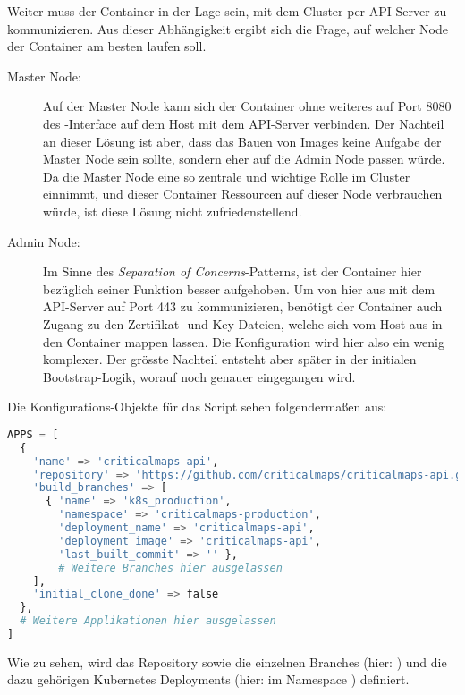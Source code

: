 Weiter muss der Container in der Lage sein, mit dem Cluster per API-Server zu
kommunizieren.
Aus dieser Abhängigkeit ergibt sich die Frage, auf welcher Node der Container
am besten laufen soll.
\begin{description}
  \item[Master Node:] Auf der Master Node kann sich der Container ohne weiteres
  auf Port 8080 des -Interface auf dem Host mit dem API-Server
  verbinden. Der Nachteil an dieser Lösung ist aber, dass das Bauen von Images
  keine Aufgabe der Master Node sein sollte, sondern eher auf die Admin Node passen
  würde. Da die Master Node eine so zentrale und wichtige Rolle im Cluster einnimmt,
  und dieser Container Ressourcen auf dieser Node verbrauchen würde,
  ist diese Lösung nicht zufriedenstellend.
  \item[Admin Node:] Im Sinne des \emph{Separation of Concerns}-Patterns,
  ist der Container hier bezüglich seiner Funktion besser aufgehoben.
  Um von hier aus mit dem API-Server auf Port 443
  zu kommunizieren, benötigt der Container auch Zugang zu den Zertifikat- und
  Key-Dateien, welche sich vom Host aus in den Container mappen lassen.
  Die Konfiguration wird hier also ein wenig komplexer.
  Der grösste Nachteil entsteht aber später in der initialen Bootstrap-Logik,
  worauf noch genauer eingegangen wird.
\end{description}

Die Konfigurations-Objekte für das Script sehen folgendermaßen aus:

\begin{lstlisting}[language=Python,numbers=none]
APPS = [
  {
    'name' => 'criticalmaps-api',
    'repository' => 'https://github.com/criticalmaps/criticalmaps-api.git',
    'build_branches' => [
      { 'name' => 'k8s_production',
        'namespace' => 'criticalmaps-production',
        'deployment_name' => 'criticalmaps-api',
        'deployment_image' => 'criticalmaps-api',
        'last_built_commit' => '' },
        # Weitere Branches hier ausgelassen
    ],
    'initial_clone_done' => false
  },
  # Weitere Applikationen hier ausgelassen
]
\end{lstlisting}

Wie zu sehen, wird das Repository sowie die einzelnen Branches
(hier: ) und die dazu gehörigen Kubernetes Deployments
(hier:  im Namespace )
definiert.

